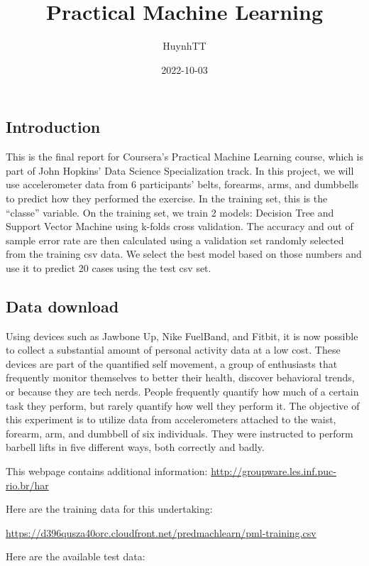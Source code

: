 \documentclass[
]{article}
\title{Practical Machine Learning}
\author{HuynhTT}
\date{2022-10-03}
\begin{document}
\maketitle

\hypertarget{introduction}{%
\subsection{Introduction}\label{introduction}}

This is the final report for Coursera's Practical Machine Learning
course, which is part of John Hopkins' Data Science Specialization
track. In this project, we will use accelerometer data from 6
participants' belts, forearms, arms, and dumbbells to predict how they
performed the exercise. In the training set, this is the ``classe''
variable. On the training set, we train 2 models: Decision Tree and
Support Vector Machine using k-folds cross validation. The accuracy and
out of sample error rate are then calculated using a validation set
randomly selected from the training csv data. We select the best model
based on those numbers and use it to predict 20 cases using the test csv
set.

\hypertarget{data-download}{%
\subsection{Data download}\label{data-download}}

Using devices such as Jawbone Up, Nike FuelBand, and Fitbit, it is now
possible to collect a substantial amount of personal activity data at a
low cost. These devices are part of the quantified self movement, a
group of enthusiasts that frequently monitor themselves to better their
health, discover behavioral trends, or because they are tech nerds.
People frequently quantify how much of a certain task they perform, but
rarely quantify how well they perform it. The objective of this
experiment is to utilize data from accelerometers attached to the waist,
forearm, arm, and dumbbell of six individuals. They were instructed to
perform barbell lifts in five different ways, both correctly and badly.

This webpage contains additional information:
\url{http://groupware.les.inf.puc-rio.br/har}

Here are the training data for this undertaking:

\url{https://d396qusza40orc.cloudfront.net/predmachlearn/pml-training.csv}

Here are the available test data:
\end{document}

